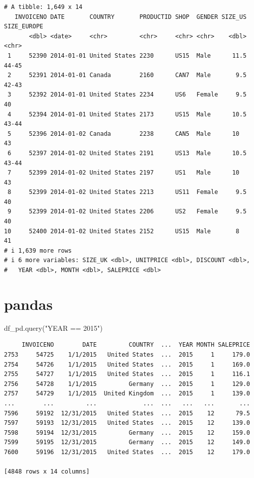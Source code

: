 \documentclass[
  letterpaper,
  DIV=11,
  numbers=noendperiod]{scrreprt}
\newenvironment{Shaded}{\begin{snugshade}}{\end{snugshade}}
\newcommand{\NormalTok}[1]{\textcolor[rgb]{0.00,0.23,0.31}{#1}}
\newcommand{\StringTok}[1]{\textcolor[rgb]{0.13,0.47,0.30}{#1}}
\begin{document}
\begin{verbatim}
# A tibble: 1,649 x 14
   INVOICENO DATE       COUNTRY       PRODUCTID SHOP  GENDER SIZE_US SIZE_EUROPE
       <dbl> <date>     <chr>         <chr>     <chr> <chr>    <dbl> <chr>      
 1     52390 2014-01-01 United States 2230      US15  Male      11.5 44-45      
 2     52391 2014-01-01 Canada        2160      CAN7  Male       9.5 42-43      
 3     52392 2014-01-01 United States 2234      US6   Female     9.5 40         
 4     52394 2014-01-01 United States 2173      US15  Male      10.5 43-44      
 5     52396 2014-01-02 Canada        2238      CAN5  Male      10   43         
 6     52397 2014-01-02 United States 2191      US13  Male      10.5 43-44      
 7     52399 2014-01-02 United States 2197      US1   Male      10   43         
 8     52399 2014-01-02 United States 2213      US11  Female     9.5 40         
 9     52399 2014-01-02 United States 2206      US2   Female     9.5 40         
10     52400 2014-01-02 United States 2152      US15  Male       8   41         
# i 1,639 more rows
# i 6 more variables: SIZE_UK <dbl>, UNITPRICE <dbl>, DISCOUNT <dbl>,
#   YEAR <dbl>, MONTH <dbl>, SALEPRICE <dbl>
\end{verbatim}

\section{pandas}

\begin{Shaded}
\begin{Highlighting}[]
\NormalTok{df\_pd.query(}\StringTok{"YEAR == 2015"}\NormalTok{)}
\end{Highlighting}
\end{Shaded}

\begin{verbatim}
     INVOICENO        DATE         COUNTRY  ...  YEAR MONTH SALEPRICE
2753     54725    1/1/2015   United States  ...  2015     1     179.0
2754     54726    1/1/2015   United States  ...  2015     1     169.0
2755     54727    1/1/2015   United States  ...  2015     1     116.1
2756     54728    1/1/2015         Germany  ...  2015     1     129.0
2757     54729    1/1/2015  United Kingdom  ...  2015     1     139.0
...        ...         ...             ...  ...   ...   ...       ...
7596     59192  12/31/2015   United States  ...  2015    12      79.5
7597     59193  12/31/2015   United States  ...  2015    12     139.0
7598     59194  12/31/2015         Germany  ...  2015    12     159.0
7599     59195  12/31/2015         Germany  ...  2015    12     149.0
7600     59196  12/31/2015   United States  ...  2015    12     179.0

[4848 rows x 14 columns]
\end{verbatim}
\end{document}
